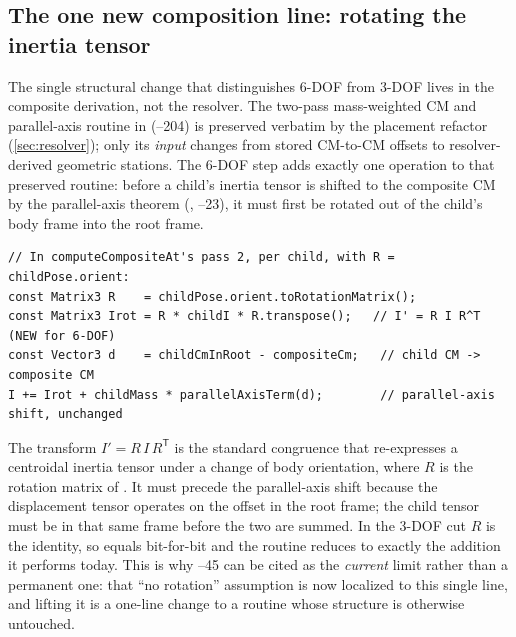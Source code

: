 \subsection{The one new composition line: rotating the inertia tensor}

The single structural change that distinguishes 6-DOF from 3-DOF lives in the composite derivation,
not the resolver. The two-pass mass-weighted CM and parallel-axis routine in 
(--204) is preserved verbatim by the placement refactor
(\cref{sec:resolver}); only its \emph{input} changes from stored CM-to-CM offsets to
resolver-derived geometric stations. The 6-DOF step adds exactly one operation to that preserved
routine: before a child's inertia tensor is shifted to the composite CM by the parallel-axis theorem
(, --23), it must first be rotated out of the
child's body frame into the root frame.

\begin{listing}[htbp]
\begin{verbatim}
// In computeCompositeAt's pass 2, per child, with R = childPose.orient:
const Matrix3 R    = childPose.orient.toRotationMatrix();
const Matrix3 Irot = R * childI * R.transpose();   // I' = R I R^T  (NEW for 6-DOF)
const Vector3 d    = childCmInRoot - compositeCm;   // child CM -> composite CM
I += Irot + childMass * parallelAxisTerm(d);        // parallel-axis shift, unchanged
\end{verbatim}
\caption{The lone 6-DOF addition to the composite math: the similarity transform
\(I' = R\,I\,R^{\mathsf T}\) re-expresses the child's centroidal tensor in the root frame before the
parallel-axis shift. In 3-DOF \(R = \mathbf{I}_3\), so  and the line is an
identity.}\label{lst:tensor-rotate}
\end{listing}

The transform \(I' = R\,I\,R^{\mathsf T}\) is the standard congruence that re-expresses a centroidal
inertia tensor under a change of body orientation, where \(R\) is the rotation matrix of
. It must precede the parallel-axis shift because the displacement tensor
 operates on the offset  in the root frame; the child tensor must be
in that same frame before the two are summed. In the 3-DOF cut \(R\) is the identity, so 
equals  bit-for-bit and the routine reduces to exactly the addition it performs today.
This is why --45 can be cited as the \emph{current} limit rather than a
permanent one: that ``no rotation'' assumption is now localized to this single line, and lifting it
is a one-line change to a routine whose structure is otherwise untouched.

